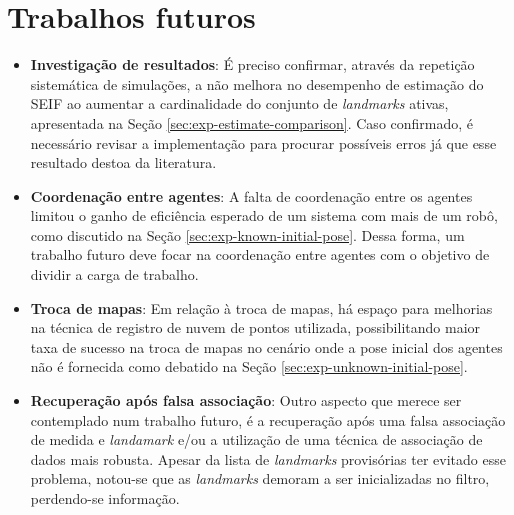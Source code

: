 \section{Trabalhos futuros}
\begin{itemize}
  \item \textbf{Investigação de resultados}: É preciso confirmar, através da 
  repetição sistemática de simulações, a não melhora no desempenho de estimação do SEIF ao aumentar a cardinalidade do conjunto de \textit{landmarks} ativas, apresentada na Seção \ref{sec:exp-estimate-comparison}. Caso confirmado, é necessário revisar a 
  implementação para procurar possíveis erros já que esse resultado 
  destoa da literatura.
  \item \textbf{Coordenação entre agentes}: A falta de 
coordenação entre os agentes limitou o ganho de eficiência esperado de 
um sistema com mais de um robô, como discutido na Seção \ref{sec:exp-known-initial-pose}. Dessa forma, um trabalho futuro deve focar na coordenação entre agentes com o objetivo de dividir a carga de trabalho.
  \item \textbf{Troca de mapas}: Em relação à troca de mapas, há espaço para melhorias na técnica de registro de nuvem de pontos utilizada, possibilitando maior taxa de sucesso na troca de mapas 
no cenário onde a pose inicial dos agentes não é fornecida como debatido na Seção \ref{sec:exp-unknown-initial-pose}. 
  \item \textbf{Recuperação após falsa associação}: Outro aspecto que merece ser contemplado num trabalho futuro, é a recuperação após uma falsa associação de medida e \textit{landamark} e/ou a 
utilização de uma técnica de associação de dados mais robusta. Apesar da 
lista de \textit{landmarks} provisórias ter evitado esse problema, notou-se que as \textit{landmarks} demoram a ser inicializadas no filtro, perdendo-se informação.
\end{itemize}





